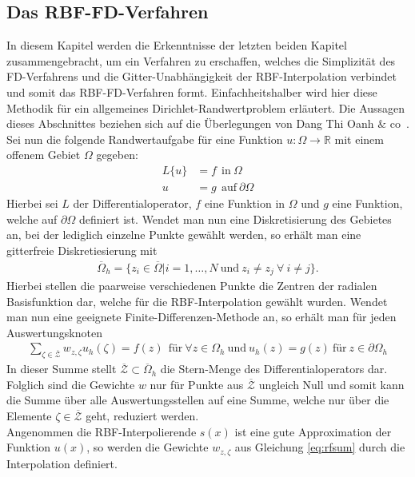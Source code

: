 \documentclass[a4paper,11pt]{article}
\begin{document}
\subsection{Das RBF-FD-Verfahren}
In diesem Kapitel werden die Erkenntnisse der letzten beiden Kapitel zusammengebracht, um ein Verfahren zu erschaffen, welches die Simplizität des FD-Verfahrens und die Gitter-Unabhängigkeit der RBF-Interpolation verbindet und somit das RBF-FD-Verfahren formt. Einfachheitshalber wird hier diese Methodik für ein allgemeines Dirichlet-Randwertproblem erläutert. Die Aussagen dieses Abschnittes beziehen sich auf die Überlegungen von Dang Thi Oanh $\&$ co~\cite{oanh2017adaptive}.\\
Sei nun die folgende Randwertaufgabe für eine Funktion $u:\Omega\rightarrow\mathbb{R}$ mit einem offenem Gebiet $\Omega$ gegeben:
\begin{align}
 L\{u\}&=f~~\text{in}~\Omega\nonumber\\
 u&=g~~\text{auf}~\partial\Omega\nonumber
\end{align}
Hierbei sei $L$ der Differentialoperator, $f$ eine Funktion in $\Omega$ und $g$ eine Funktion, welche auf $\partial\Omega$ definiert ist. Wendet man nun eine Diskretisierung des Gebietes an, bei der lediglich einzelne Punkte gewählt werden, so erhält man eine gitterfreie Diskretiesierung mit 
\begin{align}
\overline{\Omega}_h=\{z_i\in\overline{\Omega}|i=1,\dots,N~\text{und}~z_i\neq z_j~\forall~i\neq j\}.
\end{align}
Hierbei stellen die paarweise verschiedenen Punkte die Zentren der radialen Basisfunktion dar, welche für die RBF-Interpolation gewählt wurden. Wendet man nun eine geeignete Finite-Differenzen-Methode an, so erhält man für jeden Auswertungsknoten
\begin{align}
 \sum_{\zeta\in\overline{\mathcal{Z}}}w_{z,\zeta}u_h(\zeta)=f(z)~~\text{für}~\forall z\in\Omega_h~\text{und}~u_h(z)=g(z)~\text{für}~z\in\partial\Omega_h\label{eq:rfsum}
\end{align}
In dieser Summe stellt $\mathcal{\overline{Z}}\subset\overline{\Omega}_h$ die Stern-Menge des Differentialoperators dar. Folglich sind die Gewichte $w$ nur für Punkte aus $\mathcal{\overline{Z}}$ ungleich Null und somit kann die Summe über alle Auswertungsstellen auf eine Summe, welche nur über die Elemente $\zeta\in\mathcal{\overline{Z}}$ geht, reduziert werden.\\
Angenommen die RBF-Interpolierende $s(x)$ ist eine gute Approximation der Funktion $u(x)$, so werden die Gewichte $w_{z,\zeta}$ aus Gleichung \eqref{eq:rfsum} durch die Interpolation definiert.
\end{document}
